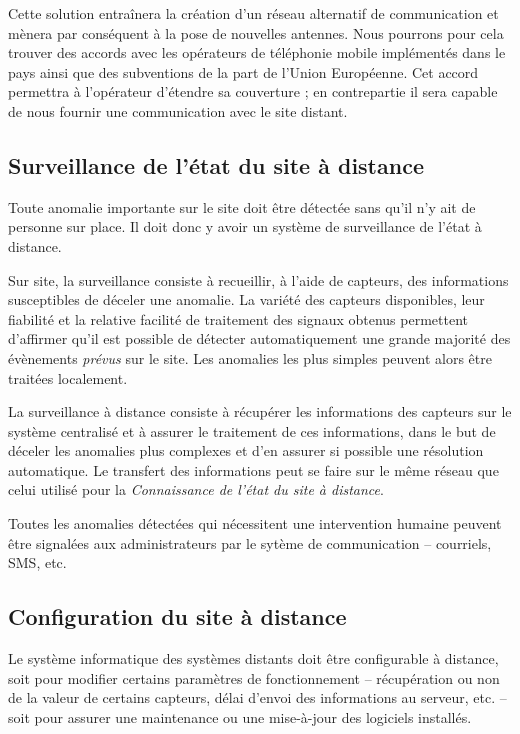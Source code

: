 \documentclass[a4paper, 11pt]{article}
\begin{document}
Cette solution entraînera la création d'un réseau alternatif de
communication et mènera par conséquent à la pose de nouvelles
antennes. Nous pourrons pour cela trouver des accords avec les
opérateurs de téléphonie mobile implémentés dans le pays ainsi que des
subventions de la part de l'Union Européenne. Cet accord permettra à
l'opérateur d'étendre sa couverture ; en contrepartie il sera capable
de nous fournir une communication avec le site distant.

\subsection{Surveillance de l'état du site à distance}
Toute anomalie importante sur le site doit être détectée sans qu'il
n'y ait de personne sur place. Il doit donc y avoir un système de
surveillance de l'état à distance.

Sur site, la surveillance consiste à recueillir, à l'aide de capteurs,
des informations susceptibles de déceler une anomalie. La variété des
capteurs disponibles, leur fiabilité et la relative facilité de
traitement des signaux obtenus permettent d'affirmer qu'il est
possible de détecter automatiquement une grande majorité des
évènements \textit{prévus} sur le site. Les anomalies les plus simples
peuvent alors être traitées localement.

La surveillance à distance consiste à récupérer les informations des
capteurs sur le système centralisé et à assurer le traitement de ces
informations, dans le but de déceler les anomalies plus complexes et
d'en assurer si possible une résolution automatique. Le transfert des
informations peut se faire sur le même réseau que celui utilisé pour
la \textit{Connaissance de l'état du site à distance}.

Toutes les anomalies détectées qui nécessitent une intervention
humaine peuvent être signalées aux administrateurs par le sytème de
communication -- courriels, SMS, etc.

\subsection{Configuration du site à distance}
Le système informatique des systèmes distants doit être configurable à
distance, soit pour modifier certains paramètres de fonctionnement --
récupération ou non de la valeur de certains capteurs, délai d'envoi
des informations au serveur, etc. -- soit pour assurer une
maintenance ou une mise-à-jour des logiciels installés.
\end{document}
